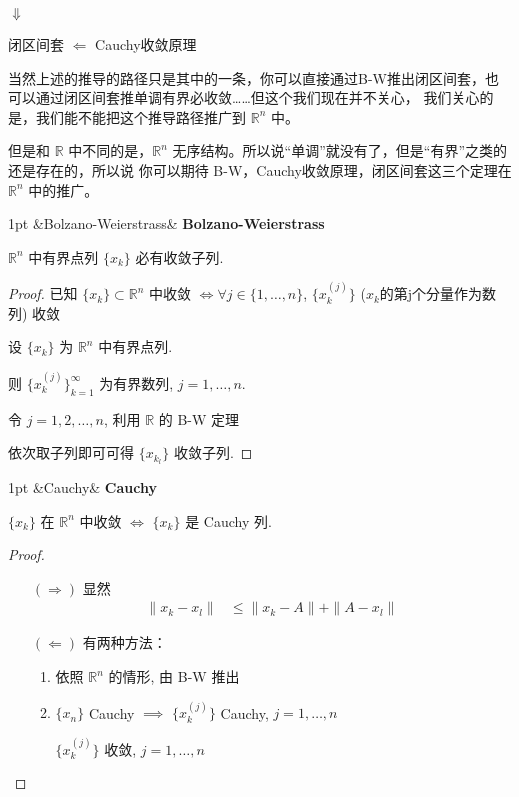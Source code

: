 \documentclass[a4paper]{article}
\newenvironment{theorem}[1][]{%
\def\FrameCommand{%
\hspace{1pt}%
{\color{theoremline}\vrule width 2pt}%
{\color{theoremshade}\vrule width 4pt}%
\colorbox{theoremshade}%
}%
\MakeFramed{\advance\hsize-\width\FrameRestore}%
\noindent
\hspace{-4.55pt}%
\begin{adjustwidth}{}{1pt}%
\setlength{\parindent}{0pt}%
\vspace{3pt}%
\ifx&#1&\else %
\textbf{#1}\par
\vspace{1pt}%
\fi }{%
\vspace{2pt}%
\end{adjustwidth}\endMakeFramed%
}
\begin{document}
    \qquad\qquad\qquad\qquad\qquad\qquad\qquad\qquad\qquad\qquad\qquad\qquad\qquad\qquad\qquad
    $\Downarrow$

    \qquad\qquad\qquad\qquad\qquad\qquad\qquad\qquad\qquad\qquad 闭区间套
    $\Leftarrow$ Cauchy收敛原理

    当然上述的推导的路径只是其中的一条，你可以直接通过B-W推出闭区间套，也可以通过闭区间套推单调有界必收敛……但这个我们现在并不关心，
    我们关心的是，我们能不能把这个推导路径推广到 $\mathbb{R}^{n}$ 中。

    但是和 $\mathbb{R}$ 中不同的是，$\mathbb{R}^{n}$ 无序结构。所以说“单调”就没有了，但是“有界”之类的还是存在的，所以说
    你可以期待 B-W，Cauchy收敛原理，闭区间套这三个定理在 $\mathbb{R}^{n}$ 中的推广。

    \begin{theorem}[Bolzano-Weierstrass]
        $\mathbb{R}^{n}$ 中有界点列 $\{x_{k}\}$ 必有收敛子列.
    \end{theorem}

    \begin{proof}[Proof]
        已知 $\{x_{k}\} \subset \mathbb{R}^{n}$ 中收敛 $\iff \forall j \in \{1, \dots
        , n\}$, $\{x_{k}^{(j)}\}$ ($x_{k}$的第j个分量作为数列) 收敛

        设 $\{x_{k}\}$ 为 $\mathbb{R}^{n}$ 中有界点列.

        则 $\{x_{k}^{(j)}\}_{k=1}^{\infty}$ 为有界数列, $j = 1, \dots, n$.

        令 $j=1, 2, \dots, n$, 利用 $\mathbb{R}$ 的 B-W 定理

        依次取子列即可可得 $\{x_{k_l}\}$ 收敛子列.
    \end{proof}

    \begin{theorem}[Cauchy]
        $\{x_{k}\}$ 在 $\mathbb{R}^{n}$ 中收敛 $\iff$ $\{x_{k}\}$ 是 Cauchy 列.
    \end{theorem}

    \begin{proof}[Proof]
        \begin{itemize}
            \item[$(\Longrightarrow)$] 显然
                \[
                    \begin{aligned}
                        \|x_{k}- x_{l}\| & \le \|x_{k}- A\| + \|A - x_{l}\|
                    \end{aligned}
                \]

            \item[$(\Longleftarrow)$] 有两种方法：
                \begin{enumerate}
                    \item 依照 $\mathbb{R}^{n}$ 的情形, 由 B-W 推出

                    \item $\{x_{n}\}$ Cauchy $\implies$ $\{x_{k}^{(j)}\}$ Cauchy,
                        $j = 1, \dots, n$

                        $\{x_{k}^{(j)}\}$ 收敛, $j = 1, \dots, n$
                \end{enumerate}
        \end{itemize}
    \end{proof}
\end{document}
